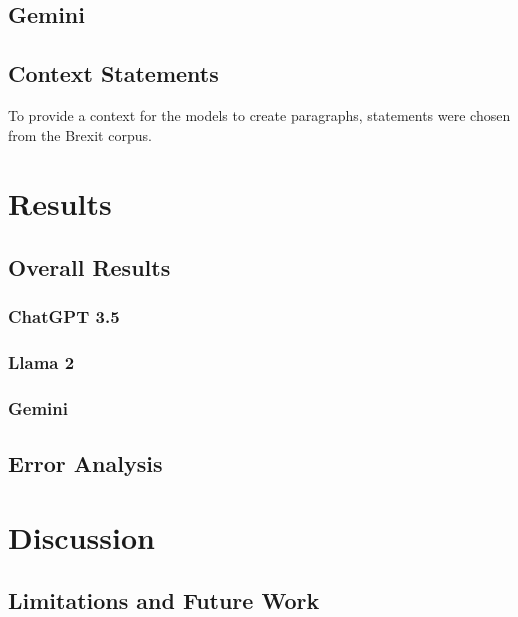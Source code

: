 \documentclass[fleqn,moreauthors,10pt]{ds_report}
\begin{document}
\subsection*{Gemini}

\subsection*{Context Statements}

To provide a context for the models to create paragraphs, statements were chosen from the Brexit corpus.


\section*{Results}

\subsection*{Overall Results}

\subsubsection*{ChatGPT 3.5}

\subsubsection*{Llama 2}

\subsubsection*{Gemini}

\subsection*{Error Analysis}


\section*{Discussion}

\subsection*{Limitations and Future Work}
\end{document}
